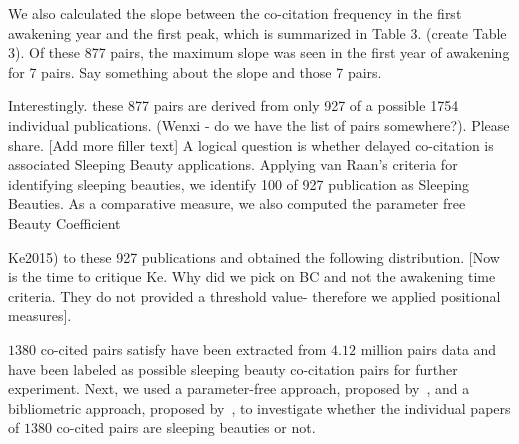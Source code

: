 \documentclass[utf8]{frontiersSCNS}
\begin{document}
We also calculated the slope between the co-citation frequency in the first awakening year and the first peak, which is summarized in Table 3. (create Table 3). Of these 877 pairs, the maximum slope was seen in the first year of awakening for 7 pairs. Say something about the slope and those 7 pairs.

Interestingly. these 877 pairs are derived from only 927 of a possible 1754 individual publications. (Wenxi - do we have the list of pairs somewhere?). Please share. [Add more filler text] A logical question is whether delayed co-citation is associated Sleeping Beauty applications. Applying van Raan's criteria for identifying sleeping beauties, we identify 100 of 927 publication as Sleeping Beauties. As a comparative measure, we also computed the parameter free Beauty Coefficient~{Ke2015) to these 927 publications and obtained the following distribution. [Now is the time to critique Ke. Why did we pick on BC and not the awakening time criteria. They do not provided a threshold value- therefore we applied positional measures].

$1380$ co-cited pairs satisfy have been extracted from $4.12$ million pairs data and have been labeled as possible sleeping beauty co-citation pairs for further experiment. 
Next, we used a parameter-free approach, proposed by~\citep{Ke2015}, and a bibliometric approach, proposed by~\citep{Raan2019}, to investigate whether the individual papers of $1380$ co-cited pairs are sleeping beauties or not. 

}
\end{document}
